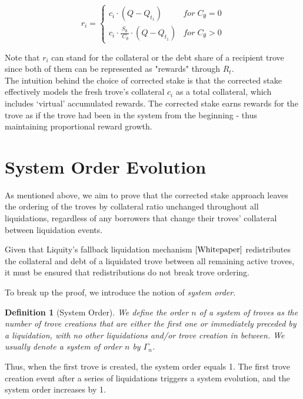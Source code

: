 \documentclass[reqno]{article}
\newtheorem{definition}{Definition}[section]
\begin{document}
\begin{equation}
    r_i=
        \begin{cases} 
            c_i \cdot (Q - Q_{t_1}) & for \;C_\emptyset = 0\\
            c_i \cdot \frac{S_\emptyset} {\;C_\emptyset} \cdot (Q - Q_{t_1}) & for \;C_\emptyset>0
        \end{cases}
\end{equation}

Note that $r_i$ can stand for the collateral or the debt share of a recipient trove since both of them can be represented as "rewards" through $R_t$. \\

The intuition behind the choice of corrected stake is that the corrected stake effectively models the fresh trove’s collateral $c_i$ as a total collateral, which includes ‘virtual’ accumulated rewards. The corrected stake earns rewards for the trove as if the trove had been in the system from the beginning - thus maintaining proportional reward growth.\\

\section{System Order Evolution}

As mentioned above, we aim to prove that the corrected stake approach leaves the ordering of the troves by collateral ratio unchanged throughout all liquidations, regardless of any borrowers that change their troves' collateral between liquidation events.

Given that Liquity's fallback liquidation mechanism $\cite{Whitepaper}$ redistributes the collateral and debt of a liquidated trove between all remaining active troves, it must be  ensured that redistributions do not break trove ordering.

To break up the proof, we introduce the notion of \textit{system order}. 

\begin{definition}[System Order]
  We define the order $n$ of a system of troves as the number of trove creations that are either the first one or immediately preceded by a liquidation, with no other liquidations and/or trove creation in between. We usually denote a system of order $n$ by $\Gamma_n$.
\end{definition}
Thus, when the first trove is created, the system order equals 1. The first trove creation event after a series of liquidations triggers a system evolution, and the system order increases by 1.
\end{document}

